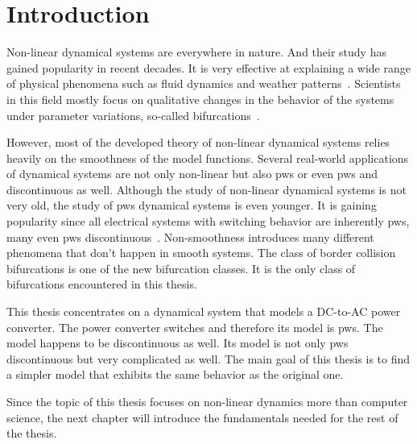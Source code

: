 \chapter{Introduction}
\label{chap:intro}

Non-linear dynamical systems are everywhere in nature.
And their study has gained popularity in recent decades.
It is very effective at explaining a wide range of physical phenomena such as fluid dynamics and weather patterns~\cite{bernardo2008piecewise}.
Scientists in this field mostly focus on qualitative changes in the behavior of the systems under parameter variations, so-called bifurcations~\cite{simpson2010}.

However, most of the developed theory of non-linear dynamical systems relies heavily on the smoothness of the model functions.
Several real-world applications of dynamical systems are not only non-linear but also \gls{pws} or even \gls{pws} and discontinuous as well.
Although the study of non-linear dynamical systems is not very old, the study of \gls{pws} dynamical systems is even younger.
It is gaining popularity since all electrical systems with switching behavior are inherently \gls{pws}, many even \gls{pws} discontinuous~\cite{simpson2010}.
Non-smoothness introduces many different phenomena that don't happen in smooth systems.
The class of border collision bifurcations is one of the new bifurcation classes.
It is the only class of bifurcations encountered in this thesis.

This thesis concentrates on a dynamical system that models a DC-to-AC power converter.
The power converter switches and therefore its model is \gls{pws}.
The model happens to be discontinuous as well.
Its model is not only \gls{pws} discontinuous but very complicated as well.
The main goal of this thesis is to find a simpler model that exhibits the same behavior as the original one.

Since the topic of this thesis focuses on non-linear dynamics more than computer science, the next chapter will introduce the fundamentals needed for the rest of the thesis.
